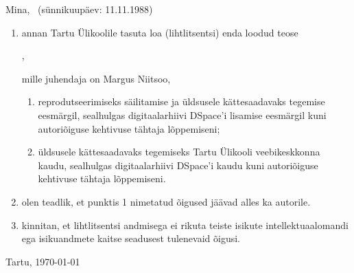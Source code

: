 \documentclass[a4paper,12pt,oneside]{article}
\numberwithin{equation}{section}
\theoremstyle{definition}
\begin{document}
\begin{subappendices}
Mina, \@author\ (sünnikuupäev: 11.11.1988)
\begin{enumerate}
\item annan Tartu Ülikoolile tasuta loa (lihtlitsentsi)
enda loodud teose
\begin{center}
\@title,
\end{center}
mille juhendaja on Margus Niitsoo,
\begin{enumerate}
\item reprodutseerimiseks säilitamise ja üldsusele
kättesaadavaks tegemise eesmärgil, sealhulgas
digitaalarhiivi DSpace'i lisamise eesmärgil kuni
autoriõiguse kehtivuse tähtaja lõppemiseni;
\item üldsusele kättesaadavaks tegemiseks Tartu Ülikooli
veebikeskkonna kaudu, sealhulgas digitaalarhiivi
DSpace'i kaudu kuni autoriõiguse kehti\-vuse tähtaja lõppemiseni.
\end{enumerate}
\item olen teadlik, et punktis 1 nimetatud õigused jäävad
alles ka autorile.
\item kinnitan, et lihtlitsentsi andmisega ei rikuta teiste
isikute intellektuaal\-o\-mandi ega isikuandmete kaitse
seadusest tulenevaid õigusi.
\end{enumerate}

\vfill

\begin{center}
Tartu,  \today
\end{center}
\makeatother

\end{subappendices}
\end{document}
